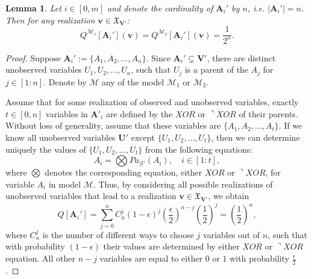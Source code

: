 \documentclass[accepted]{uai2022}
\newtheorem{lemma}{Lemma}
\newcommand{\Pa}[2]{\textit{Pa}_{#2}(#1)}
\newcommand{\V}[0]{\mathbf{V}}
\newcommand{\U}[0]{\mathbf{U}}
\newcommand{\A}[0]{\mathbf{A}}
\newcommand{\G}[0]{\mathcal{G}}
\newcommand{\M}[0]{\mathcal{M}}
\newcommand{\dom}[1]{\mathfrak{X}_{#1}}
\begin{document}
    \begin{lemma}
        Let $i \in [0, m]$ and denote the cardinality of $\A_i'$ by $n$, i.e. $|\A_i'|=n$. 
        Then for any realization $\mathbf{v}\in \dom{\V'}$:
        $$
        Q^{\M_1}[\A_i'](\mathbf{v}) = Q^{\M_2}[\A_i'](\mathbf{v}) = \frac{1}{2^n}.
        $$
    \end{lemma}
    \begin{proof}
        Suppose $\A_i':= \{A_1, A_2, \dots, A_n\}$. Since $\A_i' \subsetneq \V'$, there are distinct unobserved variables $U_1, U_2, \dots, U_n$, such that $U_j$ is a parent of the $A_j$ for $j \in [1: n]$. Denote by $\M$ any of the model $\M_1$ or $\M_2$. 
        
        Assume that for some realization of observed and unobserved variables, exactly $t\in [0, n]$ variables in $\A'_i$ are defined by the $XOR$ or $\urcorner XOR$ of their parents. Without loss of generality, assume that these variables are $\{A_1, A_2, \dots, A_t\}$. If we know all unobserved variables $\U'$ except $\{U_1, U_2, \dots, U_t\}$, then we can determine uniquely the values of $\{U_1, U_2, \dots, U_t\}$ from the following equations:
        \begin{equation*}
            A_i = \bigotimes \Pa{A_i}{\G'},\quad i\in [1:t],
        \end{equation*}
        where $\bigotimes$ denotes the corresponding equation, either $XOR$ or $\urcorner XOR$, for variable $A_i$ in model $\M$. 
        Thus, by considering all possible realizations of unobserved variables that lead to a realization $\mathbf{v} \in \dom{\V'}$, we obtain
        \begin{equation*}
            Q[\textbf{A}_i'] = \sum_{j=0}^n C_n^j(1-\epsilon)^j\left( \frac{\epsilon}{2} \right)^{n-j} \left(\frac{1}{2}\right)^j = \left(\frac{1}{2}\right)^n,
        \end{equation*}
        where $C_n^j$ is the number of different ways to choose $j$ variables out of $n$, such that with probability $(1-\epsilon)$ their values are determined by either $XOR$ or $\urcorner XOR$ equation. All other $n-j$ variables are equal to either $0$ or $1$ with probability $\frac{\epsilon}{2}$.
    \end{proof} 
    
\end{document}
